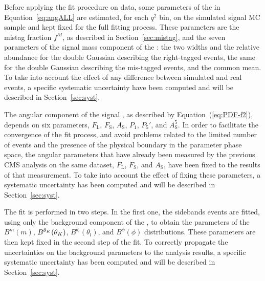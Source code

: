 Before applying the fit procedure on data, some parameters of the \pdf in Equation~\ref{eq:angALL} are estimated, for each $q^2$ bin, on the simulated signal MC sample and kept fixed for the full fitting process.
These parameters are the mistag fraction $f^{M}$, as described in Section~\ref{sec:mistag}, and the seven parameters of the signal mass component of the \pdf: the two widths and the relative abundance for the double Gaussian describing the right-tagged events, the same for the double Gaussian describing the mis-tagged events, and the common mean.
To take into account the effect of any difference between simulated and real events, a specific systematic uncertainty have been computed and will be described in Section~\ref{sec:syst}.

The angular component of the signal \pdf, as described by Equation~(\ref{eq:PDF-f2}), depends on six  parameters, $F_\mathrm{L}$, $F_\mathrm{S}$, $A_\mathrm{S}$, $P_1$, $P_5'$, and $A^5_\mathrm{S}$.
In order to facilitate the convergence of the fit process, and avoid problems related to the limited number of events and the presence of the physical boundary in the parameter phase space, the angular parameters that have already been measured by the previous CMS analysis on the same dataset, $F_\mathrm{L}$, $F_\mathrm{S}$, and $A_\mathrm{S}$, have been fixed to the results of that measurement.
To take into account the effect of fixing these parameters, a systematic uncertainty has been computed and will be described in Section~\ref{sec:syst}.



The fit is performed in two steps.
In the first one, the sidebands events are fitted, using only the background component of the \pdf, to obtain the parameters of the $B^m(m)$, $B^{\theta_K}(\theta_K)$, $B^{\theta_l}(\theta_l)$, and $B^{\phi}(\phi)$ distributions.
These parameters are then kept fixed in the second step of the fit.
To correctly propagate the uncertainties on the background parameters to the analysis results, a specific systematic uncertainty has been computed and will be described in Section~\ref{sec:syst}.

